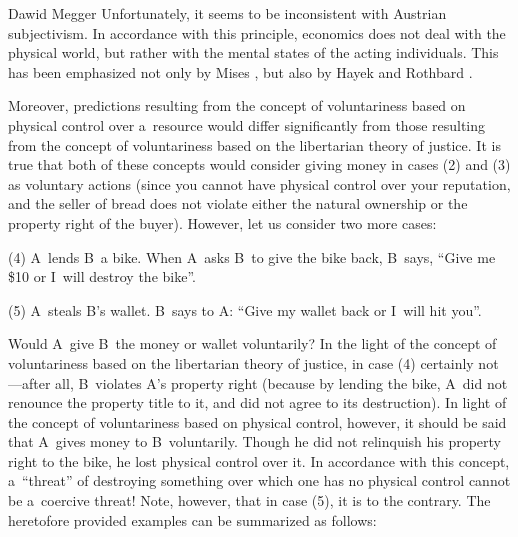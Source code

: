 \begin{artengenv}{Dawid Megger}
Unfortunately, it seems to be inconsistent with Austrian subjectivism. In accordance with this principle, economics does not deal with the physical world, but rather with the mental states of the acting individuals. This has been emphasized not only by Mises 
\parencite*[][p.92]{mises_human_1998}, %
 but also by Hayek 
\parencite*[][]{hayek_counter-revolution_1952} %
 and Rothbard 
\parencite*[][p.289]{rothbard-present}.%




Moreover, predictions resulting from the concept of voluntariness based on physical control over a~resource would differ significantly from those resulting from the concept of voluntariness based on the libertarian theory of justice. It is true that both of these concepts would consider giving money in cases (2) and (3) as voluntary actions (since you cannot have physical control over your reputation, and the seller of bread does not violate either the natural ownership or the property right of the buyer). However, let us consider two more cases:



\medskip

\noindent (4) A~lends B~a bike. When A~asks B~to give the bike back, B~says, ``Give me \$10 or I~will destroy the bike''.

\noindent (5) A~steals B's wallet. B~says to A: ``Give my wallet back or I~will hit you''.

\medskip


Would A~give B~the money or wallet voluntarily? In the light of the concept of voluntariness based on the libertarian theory of justice, in case (4) certainly not---after all, B~violates A's property right (because by lending the bike, A~did not renounce the property title to it, and did not agree to its destruction). In light of the concept of voluntariness based on physical control, however, it should be said that A~gives money to B~voluntarily. Though he did not relinquish his property right to the bike, he lost physical control over it. In accordance with this concept, a~``threat'' of destroying something over which one has no physical control cannot be a~coercive threat! Note, however, that in case (5), it is to the contrary. The heretofore provided examples can be summarized as follows:








\end{artengenv}
